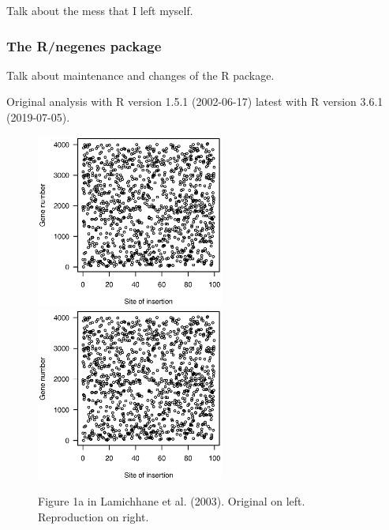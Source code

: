 Talk about the mess that I left myself.

\subsubsection{The R/negenes package}

Talk about maintenance and changes of the R package.

Original analysis with R version 1.5.1 (2002-06-17)
latest with R version 3.6.1 (2019-07-05).


\begin{figure}

\includegraphics[viewport=133 224 464 528, width=0.55\textwidth]{../original/Nov02/R/Figs/fig1.ps}
\hfill
\includegraphics[viewport=133 224 464 528, width=0.55\textwidth]{../reproduction/Figs/fig1.ps}

\caption{Figure 1a in Lamichhane et al. (2003). Original on left. Reproduction on right.}

\end{figure}

